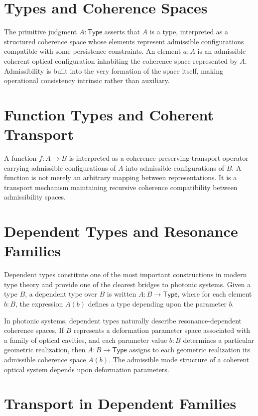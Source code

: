 \documentclass[11pt,openany]{book}
\theoremstyle{definition}
\theoremstyle{plain}
\newcommand{\Type}{\mathsf{Type}}
\begin{document}
\section{Types and Coherence Spaces}

The primitive judgment $A : \Type$ asserts that $A$ is a type, interpreted as a structured coherence space whose elements represent admissible configurations compatible with some persistence constraints. An element $a : A$ is an admissible coherent optical configuration inhabiting the coherence space represented by $A$. Admissibility is built into the very formation of the space itself, making operational consistency intrinsic rather than auxiliary.

\section{Function Types and Coherent Transport}

A function $f : A \to B$ is interpreted as a coherence-preserving transport operator carrying admissible configurations of $A$ into admissible configurations of $B$. A function is not merely an arbitrary mapping between representations. It is a transport mechanism maintaining recursive coherence compatibility between admissibility spaces.

\section{Dependent Types and Resonance Families}

Dependent types constitute one of the most important constructions in modern type theory and provide one of the clearest bridges to photonic systems. Given a type $B$, a dependent type over $B$ is written $A : B \to \Type$, where for each element $b : B$, the expression $A(b)$ defines a type depending upon the parameter $b$.

In photonic systems, dependent types naturally describe resonance-dependent coherence spaces. If $B$ represents a deformation parameter space associated with a family of optical cavities, and each parameter value $b : B$ determines a particular geometric realization, then $A : B \to \Type$ assigns to each geometric realization its admissible coherence space $A(b)$. The admissible mode structure of a coherent optical system depends upon deformation parameters.

\section{Transport in Dependent Families}
\end{document}
